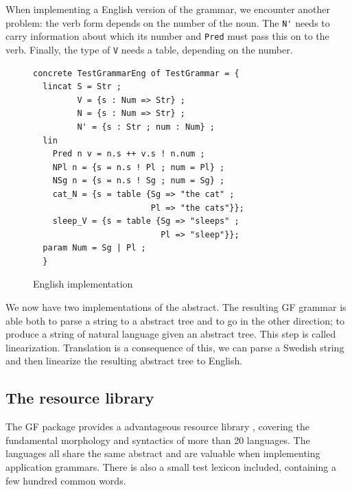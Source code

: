 \documentclass{report}
\begin{document}
When implementing a English version of the grammar, we encounter another
problem: the verb form depends on the number of the noun. The \verb|N'| needs to carry
information about which its number and \verb|Pred| must pass this on to the
verb. Finally, the type of \verb|V| needs a table, depending on the number.
\begin{figure}[h!]
\begin{verbatim}              
concrete TestGrammarEng of TestGrammar = {
  lincat S = Str ;
         V = {s : Num => Str} ;
         N = {s : Num => Str} ;
         N' = {s : Str ; num : Num} ;
  lin   
    Pred n v = n.s ++ v.s ! n.num ;
    NPl n = {s = n.s ! Pl ; num = Pl} ;
    NSg n = {s = n.s ! Sg ; num = Sg} ;
    cat_N = {s = table {Sg => "the cat" ;
                        Pl => "the cats"}};
    sleep_V = {s = table {Sg => "sleeps" ; 
                          Pl => "sleep"}};
  param Num = Sg | Pl ;
  }
\end{verbatim}           
\caption{English implementation}
\label{fig:gfTestEng}
\end{figure}


We now have two implementations of the abstract. The resulting GF grammar is able both to
parse a string to a abstract tree and to go in the other direction; to produce
a string of natural language given an abstract tree. This step is called linearization.
Translation is a consequence of this, we can parse a Swedish string and then 
linearize the resulting abstract tree to English. 

\subsection{The resource library}
\label{sec:resources}
The GF package provides a advantageous resource library \cite{gf-resource}, covering the
fundamental morphology and syntactics of more than 20 languages.
The languages all share the same abstract and are valuable
when implementing application grammars. There is also a small test lexicon
included, containing a few hundred common words.
\end{document}
